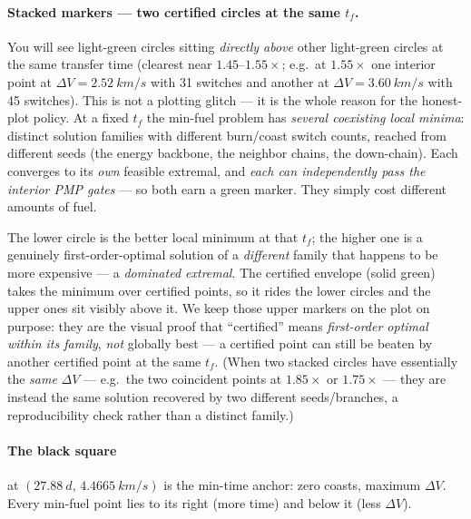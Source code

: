 \documentclass[11pt]{article}
\newcommand{\dV}{\Delta V}
\newcommand{\tf}{t_f}
\begin{document}
\paragraph{Stacked markers --- two certified circles at the same $\tf$.} You will
see light-green circles sitting \emph{directly above} other light-green circles
at the same transfer time (clearest near $1.45$--$1.55\times$; e.g.\ at
$1.55\times$ one interior point at $\dV=\SI{2.52}{km/s}$ with 31 switches and
another at $\dV=\SI{3.60}{km/s}$ with 45 switches). This is not a plotting glitch
--- it is the whole reason for the honest-plot policy. At a fixed $\tf$ the
min-fuel problem has \emph{several coexisting local minima}: distinct solution
families with different burn/coast switch counts, reached from different seeds
(the energy backbone, the neighbor chains, the down-chain). Each converges to its
\emph{own} feasible extremal, and \emph{each can independently pass the interior
PMP gates} --- so both earn a green marker. They simply cost different amounts of
fuel.

The lower circle is the better local minimum at that $\tf$; the higher one is a
genuinely first-order-optimal solution of a \emph{different} family that happens
to be more expensive --- a \emph{dominated extremal}. The certified envelope
(solid green) takes the minimum over certified points, so it rides the lower
circles and the upper ones sit visibly above it. We keep those upper markers on
the plot on purpose: they are the visual proof that ``certified'' means
\emph{first-order optimal within its family}, \emph{not} globally best --- a
certified point can still be beaten by another certified point at the same
$\tf$. (When two stacked circles have essentially the \emph{same} $\dV$ --- e.g.\
the two coincident points at $1.85\times$ or $1.75\times$ --- they are instead
the same solution recovered by two different seeds/branches, a reproducibility
check rather than a distinct family.)

\paragraph{The black square} at $(\SI{27.88}{d},\,\SI{4.4665}{km/s})$ is the
min-time anchor: zero coasts, maximum $\dV$. Every min-fuel point lies to its
right (more time) and below it (less $\dV$).
\end{document}
